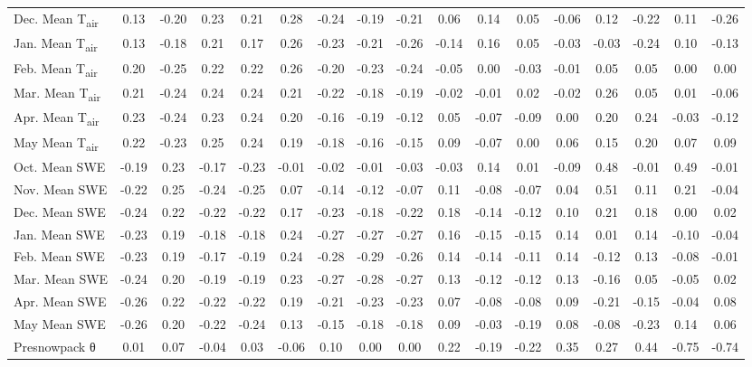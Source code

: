 \begin{sidewaystable}
\begin{threeparttable}
\begin{tabular}{lcccccccccccccccc}
            Dec. Mean T\textsubscript{air}	&0.13	&-0.20	&0.23	&0.21	&0.28	&-0.24	&-0.19	&-0.21	&0.06	&0.14	&0.05	&-0.06	&0.12	&-0.22	&0.11	&-0.26\\
            Jan. Mean T\textsubscript{air}	&0.13	&-0.18	&0.21	&0.17	&0.26	&-0.23	&-0.21	&-0.26	&-0.14	&0.16	&0.05	&-0.03	&-0.03	&-0.24	&0.10	&-0.13\\
            Feb. Mean T\textsubscript{air}	&0.20	&-0.25	&0.22	&0.22	&0.26	&-0.20	&-0.23	&-0.24	&-0.05	&0.00	&-0.03	&-0.01	&0.05	&0.05	&0.00	&0.00\\
            Mar. Mean T\textsubscript{air}	&0.21	&-0.24	&0.24	&0.24	&0.21	&-0.22	&-0.18	&-0.19	&-0.02	&-0.01	&0.02	&-0.02	&0.26	&0.05	&0.01	&-0.06\\
            Apr. Mean T\textsubscript{air}	&0.23	&-0.24	&0.23	&0.24	&0.20	&-0.16	&-0.19	&-0.12	&0.05	&-0.07	&-0.09	&0.00	&0.20	&0.24	&-0.03	&-0.12\\
            May Mean T\textsubscript{air}	&0.22	&-0.23	&0.25	&0.24	&0.19	&-0.18	&-0.16	&-0.15	&0.09	&-0.07	&0.00	&0.06	&0.15	&0.20	&0.07	&0.09\\
            Oct. Mean SWE	&-0.19	&0.23	&-0.17	&-0.23	&-0.01	&-0.02	&-0.01	&-0.03	&-0.03	&0.14	&0.01	&-0.09	&0.48	&-0.01	&0.49	&-0.01\\
            Nov. Mean SWE	&-0.22	&0.25	&-0.24	&-0.25	&0.07	&-0.14	&-0.12	&-0.07	&0.11	&-0.08	&-0.07	&0.04	&0.51	&0.11	&0.21	&-0.04\\
            Dec. Mean SWE	&-0.24	&0.22	&-0.22	&-0.22	&0.17	&-0.23	&-0.18	&-0.22	&0.18	&-0.14	&-0.12	&0.10	&0.21	&0.18	&0.00	&0.02\\
            Jan. Mean SWE	&-0.23	&0.19	&-0.18	&-0.18	&0.24	&-0.27	&-0.27	&-0.27	&0.16	&-0.15	&-0.15	&0.14	&0.01	&0.14	&-0.10	&-0.04\\
            Feb. Mean SWE	&-0.23	&0.19	&-0.17	&-0.19	&0.24	&-0.28	&-0.29	&-0.26	&0.14	&-0.14	&-0.11	&0.14	&-0.12	&0.13	&-0.08	&-0.01\\
            Mar. Mean SWE	&-0.24	&0.20	&-0.19	&-0.19	&0.23	&-0.27	&-0.28	&-0.27	&0.13	&-0.12	&-0.12	&0.13	&-0.16	&0.05	&-0.05	&0.02\\
            Apr. Mean SWE	&-0.26	&0.22	&-0.22	&-0.22	&0.19	&-0.21	&-0.23	&-0.23	&0.07	&-0.08	&-0.08	&0.09	&-0.21	&-0.15	&-0.04	&0.08\\
            May Mean SWE	&-0.26	&0.20	&-0.22	&-0.24	&0.13	&-0.15	&-0.18	&-0.18	&0.09	&-0.03	&-0.19	&0.08	&-0.08	&-0.23	&0.14	&0.06\\
            Presnowpack θ\tnote{c}	&0.01	&0.07	&-0.04	&0.03	&-0.06	&0.10	&0.00	&0.00	&0.22	&-0.19	&-0.22	&0.35	&0.27	&0.44	&-0.75	&-0.74\\

\end{tabular}
\end{threeparttable}
\end{sidewaystable}
